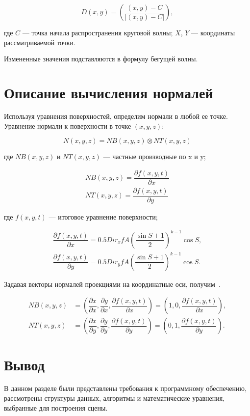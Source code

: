 \begin{equation}
        D(x,y) = \left(\dfrac{(x, y) - C}{|(x, y) - C|}\right),
\end{equation}

где $C$ — точка начала распространения круговой волны; 
$X$, $Y$ — координаты рассматриваемой точки.


Измененные значения подставляются в формулу бегущей волны.

\section{Описание вычисления нормалей}

Используя уравнения поверхностей, определим нормали в любой ее точке. 
Уравнение нормали к поверхности в точке $(x, y, z)$:

\begin{equation}
    N(x,y,z) = NB(x,y,z)\otimes NT(x,y,z)
\end{equation}

где $NB(x, y, z)$ и $NT(x, y, z)$ — частные производные по x и y;

\begin{align}
    NB(x, y, z) = \dfrac{\partial f(x,y,t)}{\partial x} \\
    NT(x, y, z) = \dfrac{\partial f(x,y,t)}{\partial y}
\end{align}

где $f(x, y, t)$ — итоговое уравнение поверхности;

\begin{align}
    \dfrac{\partial f(x,y,t)}{\partial x} = 0.5Dir_x f A\left(\dfrac{\sin{S} + 1}{2}\right)^{k-1}\cos{S}, \\
    \dfrac{\partial f(x,y,t)}{\partial y} = 0.5Dir_y f A\left(\dfrac{\sin{S} + 1}{2}\right)^{k-1}\cos{S}.
\end{align}


Задавая векторы нормалей проекциями на координатные оси, получим~\cite{WAVE}.

\begin{align}
    NB(x, y, z) &= \left(\dfrac{\partial x}{\partial x}, \dfrac{\partial y}{\partial x}, \dfrac{\partial f(x,y,t)}{\partial x}\right) = \left(1, 0, \dfrac{\partial f(x,y,t)}{\partial x}\right), \\
    NT(x, y, z) &= \left(\dfrac{\partial x}{\partial y}, \dfrac{\partial y}{\partial y}, \dfrac{\partial f(x,y,t)}{\partial y}\right) = \left(0, 1, \dfrac{\partial f(x,y,t)}{\partial y}\right).
\end{align}

\section*{Вывод}
В данном разделе были представлены требования к программному обеспечению, рассмотрены структуры данных, алгоритмы и математические уравнения, выбранные для построения сцены.
